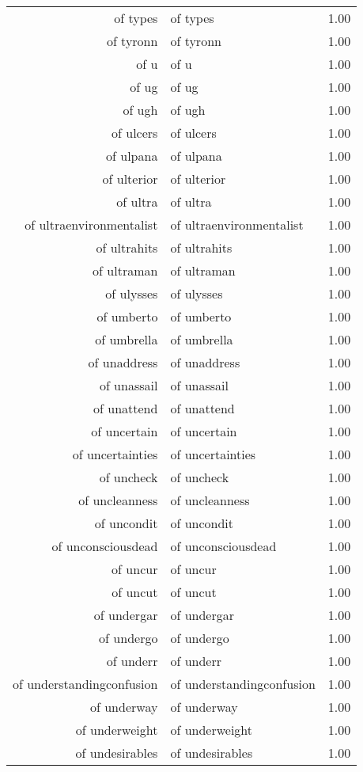 \begin{table}[ht]
\begin{tabular}{rlr}
  of types & of types & 1.00 \\ 
  of tyronn & of tyronn & 1.00 \\ 
  of u & of u & 1.00 \\ 
  of ug & of ug & 1.00 \\ 
  of ugh & of ugh & 1.00 \\ 
  of ulcers & of ulcers & 1.00 \\ 
  of ulpana & of ulpana & 1.00 \\ 
  of ulterior & of ulterior & 1.00 \\ 
  of ultra & of ultra & 1.00 \\ 
  of ultraenvironmentalist & of ultraenvironmentalist & 1.00 \\ 
  of ultrahits & of ultrahits & 1.00 \\ 
  of ultraman & of ultraman & 1.00 \\ 
  of ulysses & of ulysses & 1.00 \\ 
  of umberto & of umberto & 1.00 \\ 
  of umbrella & of umbrella & 1.00 \\ 
  of unaddress & of unaddress & 1.00 \\ 
  of unassail & of unassail & 1.00 \\ 
  of unattend & of unattend & 1.00 \\ 
  of uncertain & of uncertain & 1.00 \\ 
  of uncertainties & of uncertainties & 1.00 \\ 
  of uncheck & of uncheck & 1.00 \\ 
  of uncleanness & of uncleanness & 1.00 \\ 
  of uncondit & of uncondit & 1.00 \\ 
  of unconsciousdead & of unconsciousdead & 1.00 \\ 
  of uncur & of uncur & 1.00 \\ 
  of uncut & of uncut & 1.00 \\ 
  of undergar & of undergar & 1.00 \\ 
  of undergo & of undergo & 1.00 \\ 
  of underr & of underr & 1.00 \\ 
  of understandingconfusion & of understandingconfusion & 1.00 \\ 
  of underway & of underway & 1.00 \\ 
  of underweight & of underweight & 1.00 \\ 
  of undesirables & of undesirables & 1.00 \\ 

\end{tabular}
\end{table}
